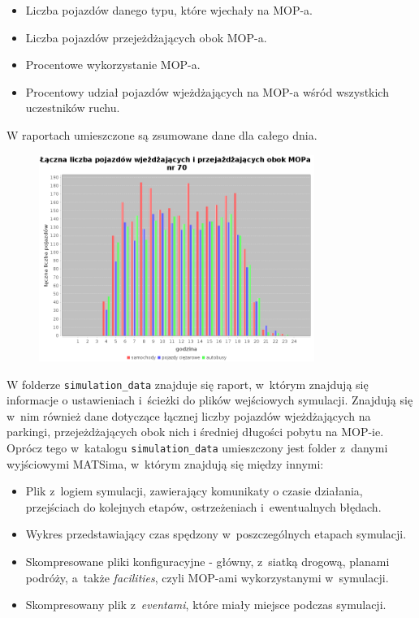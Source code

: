 \begin{itemize}
\item Liczba pojazdów danego typu, które wjechały na MOP-a.
\item Liczba pojazdów przejeżdżających obok MOP-a.
\item Procentowe wykorzystanie MOP-a.
\item Procentowy udział pojazdów wjeżdżających na MOP-a wśród wszystkich uczestników ruchu.
\end{itemize}
W raportach umieszczone są zsumowane dane dla całego dnia.
    \begin{figure}[h]
        \centering
        \includegraphics[width=0.8\textwidth]{images/mopsim/passingVehicles.png}
    \end{figure}
W folderze \texttt{simulation\_data} znajduje się raport, w~którym znajdują się informacje o ustawieniach i~ścieżki do plików wejściowych symulacji. Znajdują się w~nim również dane dotyczące łącznej liczby pojazdów wjeżdżających na parkingi, przejeżdżających obok nich i
średniej długości pobytu na MOP-ie. Oprócz tego w~katalogu \texttt{simulation\_data} umieszczony jest folder z~danymi wyjściowymi MATSima, w~którym znajdują się między innymi:
\begin{itemize}
\item Plik z~logiem symulacji, zawierający komunikaty o czasie działania, przejściach do kolejnych etapów, ostrzeżeniach i~ewentualnych błędach.
\item Wykres przedstawiający czas spędzony w~poszczególnych etapach symulacji.
\item Skompresowane pliki konfiguracyjne - główny, z~siatką drogową, planami podróży, a~także \textit{facilities}, czyli MOP-ami wykorzystanymi w~symulacji.
\item Skompresowany plik z~\textit{eventami}, które miały miejsce podczas symulacji.
\end{itemize}
